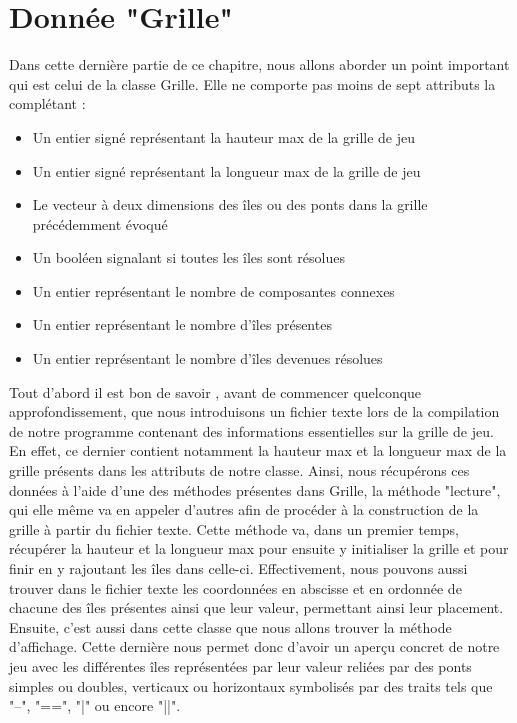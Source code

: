 \section{Donnée "Grille"}
Dans cette dernière partie de ce chapitre, nous allons aborder un point important qui est celui de la classe Grille. Elle ne comporte pas moins de sept attributs la complétant :
\begin{itemize}
    \item Un entier signé représentant la hauteur max de la grille de jeu
    \item Un entier signé représentant la longueur max de la grille de jeu
    \item Le vecteur à deux dimensions des îles ou des ponts dans la grille précédemment évoqué
    \item Un booléen signalant si toutes les îles sont résolues
    \item Un entier représentant le nombre de composantes connexes 
    \item Un entier représentant le nombre d'îles présentes
    \item Un entier représentant le nombre d'îles devenues résolues
\end{itemize}
\smallbreak
Tout d'abord il est bon de savoir , avant de commencer quelconque approfondissement, que nous introduisons un fichier texte lors de la compilation de notre programme contenant des informations essentielles sur la grille de jeu. En effet, ce dernier contient notamment la hauteur max et la longueur max de la grille présents dans les attributs de notre classe. Ainsi, nous récupérons ces données à l'aide d'une des méthodes présentes dans Grille, la méthode "lecture", qui elle même va en appeler d'autres afin de procéder à la construction de la grille à partir du fichier texte. Cette méthode va, dans un premier temps, récupérer la hauteur et la longueur max pour ensuite y initialiser la grille et pour finir en y rajoutant les îles dans celle-ci. Effectivement, nous pouvons aussi trouver dans le fichier texte les coordonnées en abscisse et en ordonnée de chacune des îles présentes ainsi que leur valeur, permettant ainsi leur placement. \newline
Ensuite, c'est aussi dans cette classe que nous allons trouver la méthode d'affichage. Cette dernière nous permet donc d'avoir un aperçu concret de notre jeu avec les différentes îles représentées par leur valeur reliées par des ponts simples ou doubles, verticaux ou horizontaux symbolisés par des traits tels que "--", "==", "|" ou encore "||". \newline
